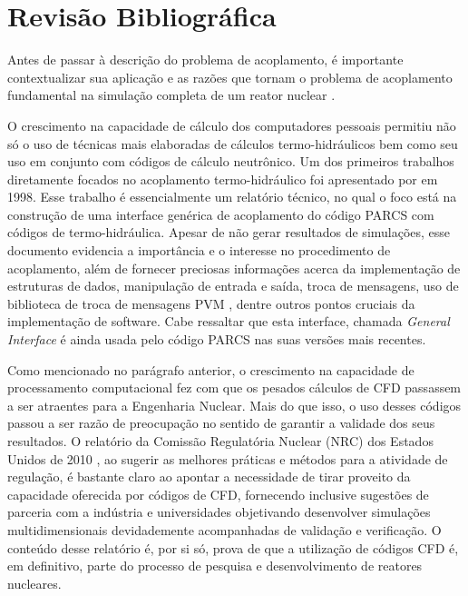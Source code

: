 \chapter*[Revisão Bibliográfica]{Revisão Bibliográfica}
\label{chap:rev}



Antes de passar à descrição do problema de acoplamento, é importante contextualizar sua 
aplicação e as razões que tornam o problema de acoplamento fundamental na simulação completa 
de um reator nuclear .

O crescimento na capacidade de cálculo dos computadores pessoais permitiu não só o uso 
de técnicas mais elaboradas de cálculos termo-hidráulicos bem como seu uso em conjunto 
com códigos de cálculo neutrônico. Um dos primeiros trabalhos diretamente focados no 
acoplamento termo-hidráulico foi apresentado por \cite{Barber98} em 1998. Esse trabalho 
é essencialmente um relatório técnico, no qual o foco está na construção de uma interface 
genérica de acoplamento do código PARCS com códigos de termo-hidráulica. Apesar de não 
gerar resultados de simulações, esse documento evidencia a importância e o interesse 
no procedimento de acoplamento, além de fornecer preciosas informações acerca da 
implementação de estruturas de dados, manipulação de entrada e saída, troca de mensagens, 
uso de biblioteca de troca de mensagens PVM \cite{Geist94}, dentre outros pontos cruciais
da implementação de software. Cabe ressaltar que esta interface, 
chamada \textit{General Interface} é ainda usada pelo código PARCS nas suas versões mais 
recentes. 

Como mencionado no parágrafo anterior, o crescimento na capacidade de processamento
computacional 
fez com que os pesados cálculos de CFD passassem a ser atraentes 
para a Engenharia Nuclear. Mais do que isso, o uso desses códigos passou a ser razão 
de preocupação no sentido de garantir a validade dos seus resultados. O relatório 
da Comissão Regulatória Nuclear (NRC) dos Estados Unidos de 2010 \cite[p.69]{NUREG2010}, 
ao sugerir as melhores práticas e métodos para a atividade de regulação, é bastante claro 
ao apontar a necessidade de tirar proveito da capacidade oferecida por códigos de CFD, 
fornecendo inclusive sugestões de parceria com a indústria e universidades objetivando 
desenvolver simulações multidimensionais devidademente acompanhadas de validação e
verificação. O conteúdo desse relatório é, por si só, prova de que a utilização de 
códigos CFD é, em definitivo, parte do processo de 
pesquisa e desenvolvimento de reatores nucleares. 

